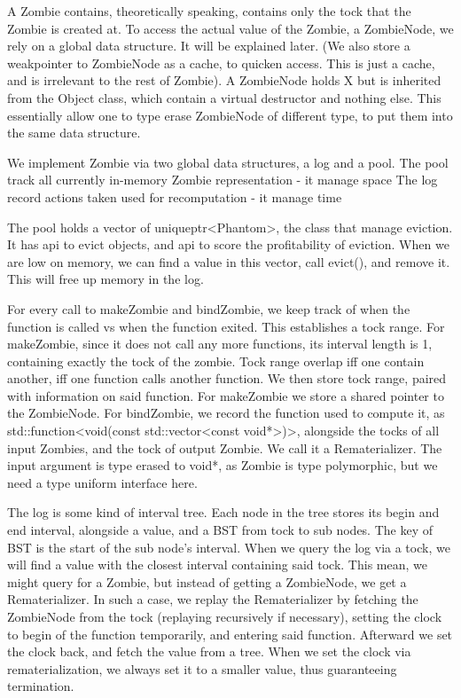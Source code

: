 A Zombie contains, theoretically speaking, contains only the tock that the Zombie is created at.
To access the actual value of the Zombie, a ZombieNode, we rely on a global data structure.
It will be explained later.
(We also store a weakpointer to ZombieNode as a cache, to quicken access. This is just a cache, and is irrelevant to the rest of Zombie).
A ZombieNode holds X but is inherited from the Object class, which contain a virtual destructor and nothing else. This essentially allow one to type erase ZombieNode of different type, to put them into the same data structure.

We implement Zombie via two global data structures, a log and a pool.
The pool track all currently in-memory Zombie representation - it manage space
The log record actions taken used for recomputation - it manage time

The pool holds a vector of uniqueptr<Phantom>, the class that manage eviction.
It has api to evict objects, and api to score the profitability of eviction.
When we are low on memory, we can find a value in this vector, call evict(), and remove it.
This will free up memory in the log.

For every call to makeZombie and bindZombie, we keep track of when the function is called vs when the function exited. This establishes a tock range. 
For makeZombie, since it does not call any more functions, its interval length is 1, containing exactly the tock of the zombie.
Tock range overlap iff one contain another, iff one function calls another function. We then store tock range, paired with information on said function. 
For makeZombie we store a shared pointer to the ZombieNode. 
For bindZombie, we record the function used to compute it, as std::function<void(const std::vector<const void*>)>, alongside the tocks of all input Zombies, and the tock of output Zombie. We call it a Rematerializer. The input argument is type erased to void*, as Zombie is type polymorphic, but we need a type uniform interface here.

The log is some kind of interval tree. Each node in the tree stores its begin and end interval, alongside a value, and a BST from tock to sub nodes. The key of BST is the start of the sub node’s interval. When we query the log via a tock, we will find a value with the closest interval containing said tock. This mean, we might query for a Zombie, but instead of getting a ZombieNode, we get a Rematerializer.
In such a case, we replay the Rematerializer by fetching the ZombieNode from the tock (replaying recursively if necessary), setting the clock to begin of the function temporarily, and entering said function. Afterward we set the clock back, and fetch the value from a tree.
When we set the clock via rematerialization, we always set it to a smaller value, thus guaranteeing termination.

